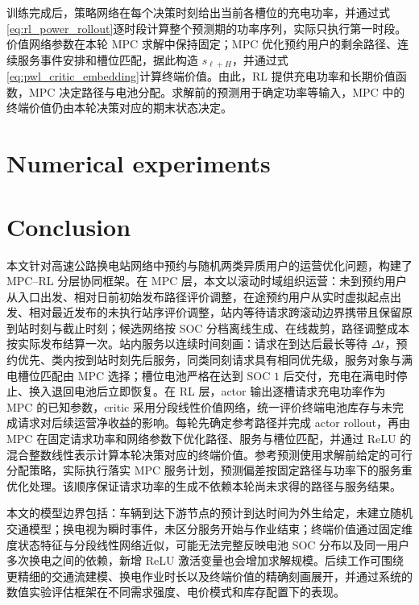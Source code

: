 \documentclass[12pt,a4paper,UTF8]{ctexart}
\begin{document}
训练完成后，策略网络在每个决策时刻给出当前各槽位的充电功率，并通过式\eqref{eq:rl_power_rollout}逐时段计算整个预测期的功率序列，实际只执行第一时段。价值网络参数在本轮 MPC 求解中保持固定；MPC 优化预约用户的剩余路径、连续服务事件安排和槽位匹配，据此构造 $s_{\ell+H}$，并通过式\eqref{eq:pwl_critic_embedding}计算终端价值。由此，RL 提供充电功率和长期价值函数，MPC 决定路径与电池分配。求解前的预测用于确定功率等输入，MPC 中的终端价值仍由本轮决策对应的期末状态决定。


\section{Numerical experiments}



\section{Conclusion}

本文针对高速公路换电站网络中预约与随机两类异质用户的运营优化问题，构建了 MPC--RL 分层协同框架。在 MPC 层，本文以滚动时域组织运营：未到预约用户从入口出发、相对日前初始发布路径评价调整，在途预约用户从实时虚拟起点出发、相对最近发布的未执行站序评价调整，站内等待请求跨滚动边界携带且保留原到站时刻与截止时刻；候选网络按 SOC 分档离线生成、在线裁剪，路径调整成本按实际发布结算一次。站内服务以连续时间刻画：请求在到达后最长等待 $\Delta t$，预约优先、类内按到站时刻先后服务，同类同刻请求具有相同优先级，服务对象与满电槽位匹配由 MPC 选择；槽位电池严格在达到 SOC $1$ 后交付，充电在满电时停止、换入退回电池后立即恢复。在 RL 层，actor 输出逐槽请求充电功率作为 MPC 的已知参数，critic 采用分段线性价值网络，统一评价终端电池库存与未完成请求对后续运营净收益的影响。每轮先确定参考路径并完成 actor rollout，再由 MPC 在固定请求功率和网络参数下优化路径、服务与槽位匹配，并通过 ReLU 的混合整数线性表示计算本轮决策对应的终端价值。参考预测使用求解前给定的可行分配策略，实际执行落实 MPC 服务计划，预测偏差按固定路径与功率下的服务重优化处理。该顺序保证请求功率的生成不依赖本轮尚未求得的路径与服务结果。

本文的模型边界包括：车辆到达下游节点的预计到达时间为外生给定，未建立随机交通模型；换电视为瞬时事件，未区分服务开始与作业结束；终端价值通过固定维度状态特征与分段线性网络近似，可能无法完整反映电池 SOC 分布以及同一用户多次换电之间的依赖，新增 ReLU 激活变量也会增加求解规模。后续工作可围绕更精细的交通流建模、换电作业时长以及终端价值的精确刻画展开，并通过系统的数值实验评估框架在不同需求强度、电价模式和库存配置下的表现。
\end{document}
